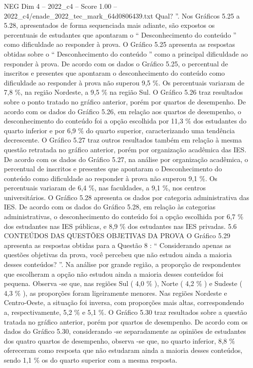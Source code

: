 \begin{textsample}{NEG Dim 4 – 2022\_c4 – Score 1.00 – 2022\_c4/enade\_2022\_tec\_mark\_64d0806439.txt}
Qual? ”.
Nos Gráficos 5.25 a 5.28, apresentados de forma sequenciada mais adiante, são expostos os percentuais de estudantes que apontaram o “ Desconhecimento do conteúdo ” como dificuldade ao responder à prova.
O Gráfico 5.25 apresenta as respostas obtidas sobre o “ Desconhecimento do conteúdo ” como a principal dificuldade ao responder à prova.
De acordo com os dados o Gráfico 5.25, o percentual de inscritos e presentes que apontaram o desconhecimento do conteúdo como dificuldade ao responder à prova não superou 9,5 \%.
Os percentuais variaram de 7,8 \%, na região Nordeste, a 9,5 \% na região Sul.
O Gráfico 5.26 traz resultados sobre o ponto tratado no gráfico anterior, porém por quartos de desempenho.
De acordo com os dados do Gráfico 5.26, em relação aos quartos de desempenho, o desconhecimento do conteúdo foi a opção escolhida por 11,3 \% dos estudantes do quarto inferior e por 6,9 \% do quarto superior, caracterizando uma tendência decrescente.
O Gráfico 5.27 traz outros resultados também em relação à mesma questão retratada no gráfico anterior, porém por organização acadêmica das IES.
De acordo com os dados do Gráfico 5.27, na análise por organização acadêmica, o percentual de inscritos e presentes que apontaram o Desconhecimento do conteúdo como dificuldade ao responder à prova não superou 9,1 \%.
Os percentuais variaram de 6,4 \%, nas faculdades, a 9,1 \%, nos centros universitários.
O Gráfico 5.28 apresenta os dados por categoria administrativa das IES.
De acordo com os dados do Gráfico 5.28, em relação às categorias administrativas, o desconhecimento do conteúdo foi a opção escolhida por 6,7 \% dos estudantes nas IES públicas, e 8,9 \% dos estudantes nas IES privadas. 5.6 CONTEÚDOS DAS QUESTÕES OBJETIVAS DA PROVA O Gráfico 5.29 apresenta as respostas obtidas para a Questão 8 : “ Considerando apenas as questões objetivas da prova, você percebeu que não estudou ainda a maioria desses conteúdos? ”.
Na análise por grande região, a proporção de respondentes que escolheram a opção não estudou ainda a maioria desses conteúdos foi pequena.
Observa -se que, nas regiões Sul ( 4,0 \% ), Norte ( 4,2 \% ) e Sudeste ( 4,3 \% ), as proporções foram ligeiramente menores.
Nas regiões Nordeste e Centro-Oeste, a situação foi inversa, com proporções mais altas, correspondendo a, respectivamente, 5,2 \% e 5,1 \%.
O Gráfico 5.30 traz resultados sobre a questão tratada no gráfico anterior, porém por quartos de desempenho.
De acordo com os dados do Gráfico 5.30, considerando -se separadamente as opiniões de estudantes dos quatro quartos de desempenho, observa -se que, no quarto inferior, 8,8 \% ofereceram como resposta que não estudaram ainda a maioria desses conteúdos, sendo 1,1 \% os do quarto superior com a mesma resposta.

\end{textsample}
